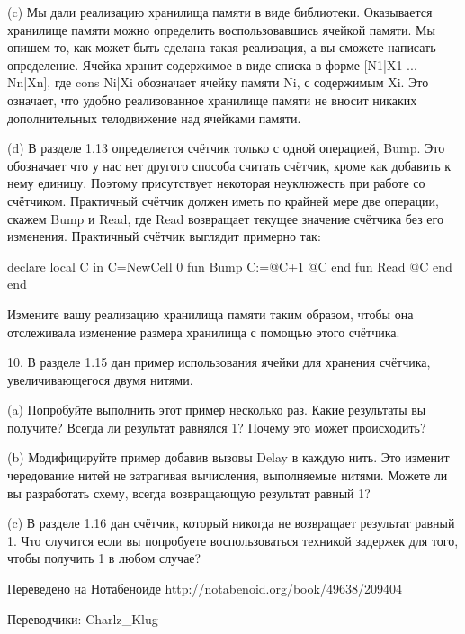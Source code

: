 (c) Мы дали реализацию хранилища памяти в виде библиотеки. Оказывается хранилище памяти можно определить воспользовавшись ячейкой памяти. Мы опишем то, как может быть сделана такая реализация, а вы сможете написать определение. Ячейка хранит содержимое в виде списка в форме [N1|X1 ... Nn|Xn], где cons Ni|Xi обозначает ячейку памяти Ni, с содержимым Xi. Это означает, что удобно реализованное хранилище памяти не вносит никаких дополнительных телодвижение над ячейками памяти.

(d) В разделе 1.13 определяется счётчик только с одной операцией, Bump. Это обозначает что у нас нет другого способа считать счётчик, кроме как добавить к нему единицу. Поэтому присутствует некоторая неуклюжесть при работе со счётчиком. Практичный счётчик должен иметь по крайней мере две операции, скажем Bump и Read, где Read возвращает текущее значение счётчика без его изменения. Практичный счётчик выглядит примерно так:

declare
local C in
C={NewCell 0}
fun {Bump}
C:=@C+1
@C
end
fun {Read}
@C
end
end

Измените вашу реализацию хранилища памяти таким образом, чтобы она отслеживала изменение размера хранилища с помощью этого счётчика.

10. В разделе 1.15 дан пример использования ячейки для хранения счётчика, увеличивающегося двумя нитями.

(a) Попробуйте выполнить этот пример несколько раз. Какие результаты вы получите? Всегда ли результат равнялся 1? Почему это может происходить?

(b) Модифицируйте пример добавив вызовы Delay в каждую нить. Это изменит чередование нитей не затрагивая вычисления, выполняемые нитями. Можете ли вы разработать схему, всегда возвращающую результат равный 1?

(c) В разделе 1.16 дан счётчик, который никогда не возвращает результат равный 1. Что случится если вы попробуете воспользоваться техникой задержек для того, чтобы получить 1 в любом случае?

Переведено на Нотабеноиде
http://notabenoid.org/book/49638/209404

Переводчики: Charlz\_Klug

